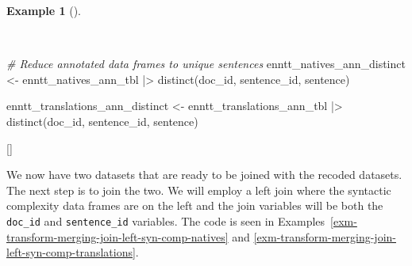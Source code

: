 \documentclass[
  letterpaper,
  krantz1]{latex/krantz-mod}
\newenvironment{Shaded}{\begin{snugshade}}{\end{snugshade}}
\newcommand{\CommentTok}[1]{\textcolor[rgb]{0.00,0.00,0.00}{\textit{#1}}}
\newcommand{\FunctionTok}[1]{\textcolor[rgb]{0.00,0.00,0.00}{#1}}
\newcommand{\NormalTok}[1]{\textcolor[rgb]{0.00,0.00,0.00}{#1}}
\newcommand{\OtherTok}[1]{\textcolor[rgb]{0.00,0.00,0.00}{#1}}
\newcommand{\SpecialCharTok}[1]{\textcolor[rgb]{0.00,0.00,0.00}{#1}}
\newcommand{\cindex}[1]{%
  \StrSubstitute{#1}{_}{\_}[\temp]%
  \index{\temp}%
}
\theoremstyle{definition}
\theoremstyle{definition}
\newtheorem{example}{Example}[chapter]
\theoremstyle{remark}
\begin{document}
\begin{example}[]\protect\hypertarget{exm-transform-merging-annotation-distinct}{}\label{exm-transform-merging-annotation-distinct}

~

\begin{Shaded}
\begin{Highlighting}[numbers=left,,]
\CommentTok{\# Reduce annotated data frames to unique sentences}
\NormalTok{enntt\_natives\_ann\_distinct }\OtherTok{\textless{}{-}}
\NormalTok{  enntt\_natives\_ann\_tbl }\SpecialCharTok{|\textgreater{}}
  \FunctionTok{distinct}\NormalTok{(doc\_id, sentence\_id, sentence)}

\NormalTok{enntt\_translations\_ann\_distinct }\OtherTok{\textless{}{-}}
\NormalTok{  enntt\_translations\_ann\_tbl }\SpecialCharTok{|\textgreater{}}
  \FunctionTok{distinct}\NormalTok{(doc\_id, sentence\_id, sentence)}
\end{Highlighting}
\end{Shaded}

\cindex{distinct()}

\end{example}

We now have two datasets that are ready to be joined with the recoded
datasets. The next step is to join the two. We will employ a left
join where the syntactic complexity
data frames are on the left and the join variables will be both the
\texttt{doc\_id} and \texttt{sentence\_id} variables. The code is seen
in Examples~\ref{exm-transform-merging-join-left-syn-comp-natives} and
\ref{exm-transform-merging-join-left-syn-comp-translations}.
\end{document}
